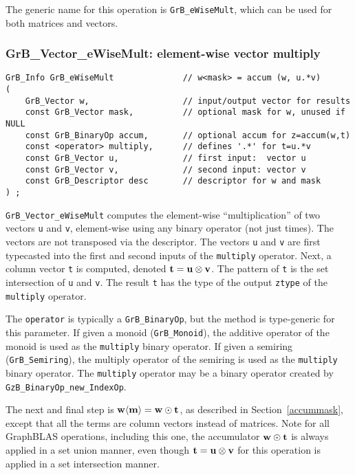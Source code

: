 \documentclass[12pt]{article}
\begin{document}
The generic name for this operation is \verb'GrB_eWiseMult', which can be used
for both matrices and vectors.

\newpage
\subsubsection{{\sf GrB\_Vector\_eWiseMult:} element-wise vector multiply}
\label{eWiseMult_vector}

\begin{mdframed}[userdefinedwidth=6in]
{\footnotesize
\begin{verbatim}
GrB_Info GrB_eWiseMult              // w<mask> = accum (w, u.*v)
(
    GrB_Vector w,                   // input/output vector for results
    const GrB_Vector mask,          // optional mask for w, unused if NULL
    const GrB_BinaryOp accum,       // optional accum for z=accum(w,t)
    const <operator> multiply,      // defines '.*' for t=u.*v
    const GrB_Vector u,             // first input:  vector u
    const GrB_Vector v,             // second input: vector v
    const GrB_Descriptor desc       // descriptor for w and mask
) ;
\end{verbatim}
} \end{mdframed}

\verb'GrB_Vector_eWiseMult' computes the element-wise ``multiplication'' of two
vectors \verb'u' and \verb'v', element-wise using any binary operator (not just
times).  The vectors are not transposed via the descriptor.  The vectors
\verb'u' and \verb'v' are first typecasted into the first and second inputs of
the \verb'multiply' operator.  Next, a column vector \verb't' is computed,
denoted ${\bf t = u \otimes v}$.  The pattern of \verb't' is the set
intersection of \verb'u' and \verb'v'.  The result \verb't' has the type of the
output \verb'ztype' of the \verb'multiply' operator.

The \verb'operator' is typically a \verb'GrB_BinaryOp', but the method is
type-generic for this parameter.  If given a monoid (\verb'GrB_Monoid'), the
additive operator of the monoid is used as the \verb'multiply' binary operator.
If given a semiring (\verb'GrB_Semiring'), the multiply operator of the
semiring is used as the \verb'multiply' binary operator.
%
The \verb'multiply' operator may be a binary operator
created by \verb'GzB_BinaryOp_new_IndexOp'.

The next and final step is ${\bf w \langle m \rangle  = w \odot t}$, as
described in Section~\ref{accummask}, except that all the terms are column
vectors instead of matrices.  Note for all GraphBLAS operations, including this
one, the accumulator ${\bf w \odot t}$ is always applied in a set union manner,
even though ${\bf t = u \otimes v}$ for this operation is applied in a set
intersection manner.
\end{document}

